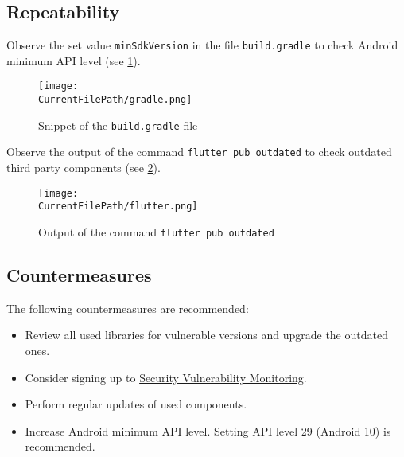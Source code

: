 

\subsection*{Repeatability}

Observe the set value \texttt{minSdkVersion} in the file \texttt{build.gradle} to check Android minimum API level (see \cref{figure:gradle}).

\begin{figure}[H]
\centering
\texttt{[image: \\CurrentFilePath/gradle.png]}
\caption{Snippet of the \texttt{build.gradle} file}
\label{figure:gradle}
\end{figure}

Observe the output of the command \texttt{flutter pub outdated} to check outdated third party components (see \cref{figure:flutter}).

\begin{figure}[H]
\centering
\texttt{[image: \\CurrentFilePath/flutter.png]}
\caption{Output of the command \texttt{flutter pub outdated}}
\label{figure:flutter}
\end{figure}
 
\pagebreak


\subsection*{Countermeasures}

The following countermeasures are recommended:

\begin{itemize}
    \item Review all used libraries for vulnerable versions and upgrade the outdated ones.
    \item Consider signing up to \href{https://svm.cert.siemens.com/portal/}{Security Vulnerability Monitoring}.
    \item Perform regular updates of used components.
    \item Increase Android minimum API level. Setting API level 29 (Android 10) is recommended.
\end{itemize}





